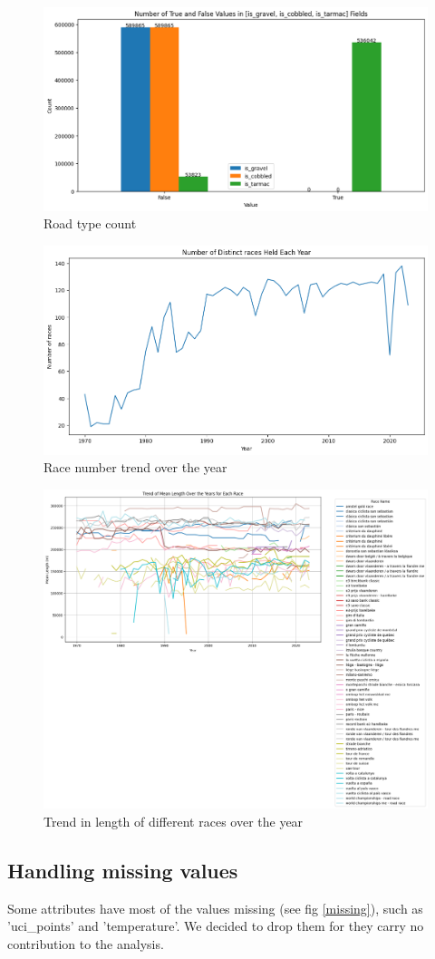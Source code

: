 \documentclass{article}
\begin{document}
\begin{figure}
\centering
\includegraphics[width=0.55\linewidth]{2.png}
\caption{\label{fig:1}Road type count}
\end{figure}

\begin{figure}
\centering
\includegraphics[width=0.55\linewidth]{1.png}
\caption{\label{fig:2}Race number trend over the year}
\end{figure}

\begin{figure}
\centering
\includegraphics[width=0.40\linewidth]{3.png}
\caption{\label{fig:3}Trend in length of different races over the year}
\end{figure}








\subsection{Handling missing values}

Some attributes have most of the values missing (see fig \ref{missing}), such as 'uci\_points' and 'temperature'. We decided to drop them for they carry no contribution to the analysis.
\end{document}

